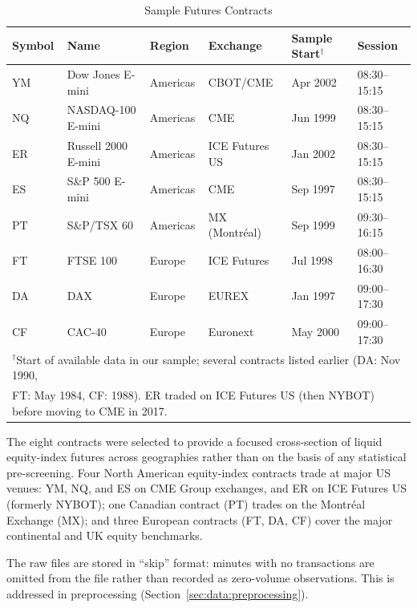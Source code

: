 \documentclass[12pt,a4paper]{article}
\begin{document}
\begin{table}[htbp]
\begin{center}
\caption{Sample Futures Contracts}
\begin{tabular}{llllll}
\hline
Symbol & Name & Region & Exchange & Sample Start$^{\dagger}$ & Session \\
\hline
YM & Dow Jones E-mini      & Americas & CBOT/CME           & Apr 2002    & 08:30--15:15 \\
NQ & NASDAQ-100 E-mini     & Americas & CME                & Jun 1999    & 08:30--15:15 \\
ER & Russell 2000 E-mini   & Americas & ICE Futures US     & Jan 2002    & 08:30--15:15 \\
ES & S\&P 500 E-mini       & Americas & CME                & Sep 1997    & 08:30--15:15 \\
PT & S\&P/TSX 60           & Americas & MX (Montr\'{e}al) & Sep 1999    & 09:30--16:15 \\
FT & FTSE 100              & Europe   & ICE Futures        & Jul 1998    & 08:00--16:30 \\
DA & DAX                   & Europe   & EUREX              & Jan 1997    & 09:00--17:30 \\
CF & CAC-40                & Europe   & Euronext           & May 2000    & 09:00--17:30 \\
\hline
\multicolumn{6}{l}{$^{\dagger}$Start of available data in our sample; several contracts listed earlier (DA: Nov 1990,}\\
\multicolumn{6}{l}{\phantom{$^{\dagger}$}FT: May 1984, CF: 1988). ER traded on ICE Futures US (then NYBOT) before moving to CME in 2017.}\\
\end{tabular}
\label{tab:markets}
\end{center}
\end{table}

The eight contracts were selected to provide a focused cross-section of
liquid equity-index futures across geographies rather than on the basis of
any statistical pre-screening. Four North American equity-index contracts trade at major US venues: YM, NQ, and ES on CME Group exchanges, and ER on ICE Futures US (formerly NYBOT); one Canadian contract (PT) trades on the Montr\'{e}al Exchange (MX); and three European contracts (FT, DA, CF) cover the major continental and UK equity benchmarks.

The raw files are stored in ``skip'' format: minutes with no transactions are
omitted from the file rather than recorded as zero-volume observations. This
is addressed in preprocessing (Section~\ref{sec:data:preprocessing}).
\end{document}

